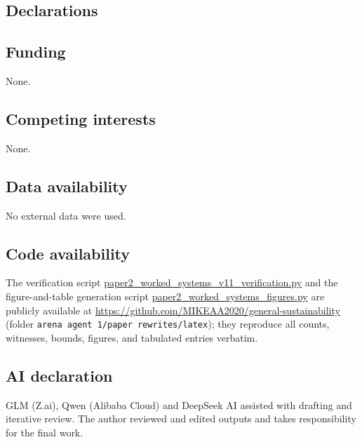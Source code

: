 \documentclass[10pt,twocolumn]{article}
\theoremstyle{definition}
\begin{document}
\subsection*{Declarations}

\subsection*{Funding}
None.

\subsection*{Competing interests}
None.

\subsection*{Data availability}
No external data were used.

\subsection*{Code availability}
The verification script \url{paper2_worked_systems_v11_verification.py}
and the figure-and-table generation script
\url{paper2_worked_systems_figures.py} are publicly available at
\url{https://github.com/MIKEAA2020/general-sustainability} (folder
\texttt{arena agent 1/paper rewrites/latex}); they reproduce all
counts, witnesses, bounds, figures, and tabulated entries verbatim.

\subsection*{AI declaration}
GLM (Z.ai), Qwen (Alibaba Cloud) and DeepSeek AI assisted with drafting
and iterative review. The author reviewed and edited outputs and takes
responsibility for the final work.
\end{document}
